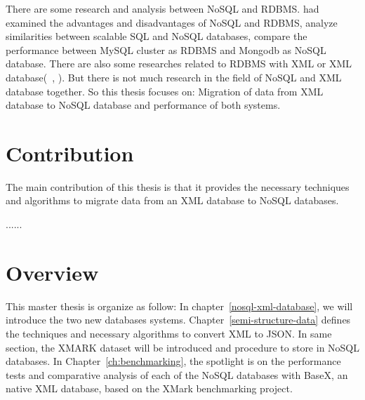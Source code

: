 	\par		
	There are some research and analysis between NoSQL and RDBMS. \citet{nance2013nosql} had examined the advantages and disadvantages of NoSQL and RDBMS, \cite{cattell2011scalable} analyze similarities between scalable SQL and NoSQL databases, \cite{hadjigeorgiou2013rdbms}  compare the performance between MySQL cluster as RDBMS and Mongodb as NoSQL database.  There are also some researches related to RDBMS with XML or XML database(~\citet{jiang2002xparent}, \citet{shanmugasundaram1999relational}). But there is not much research in the field of NoSQL and XML database together. So this thesis focuses on: Migration of data from XML database to NoSQL database and  performance of both systems.	
	
	\section{Contribution}
		The main contribution of this thesis is that it provides the necessary techniques and algorithms to migrate data from an XML database to NoSQL databases. 
	    
	    ......
	    
		
		
	\section{Overview }
		This master thesis is organize as follow: In chapter~\ref{nosql-xml-database}, we will introduce the two new databases systems. Chapter~\ref{semi-structure-data} defines the techniques and necessary algorithms to convert XML  to JSON. In same section, the XMARK dataset will be introduced and procedure to store in NoSQL databases. In Chapter~\ref{ch:benchmarking}, the spotlight is on the performance tests and comparative analysis of each of the NoSQL databases with BaseX, an native XML database, based on the XMark benchmarking project.		
	